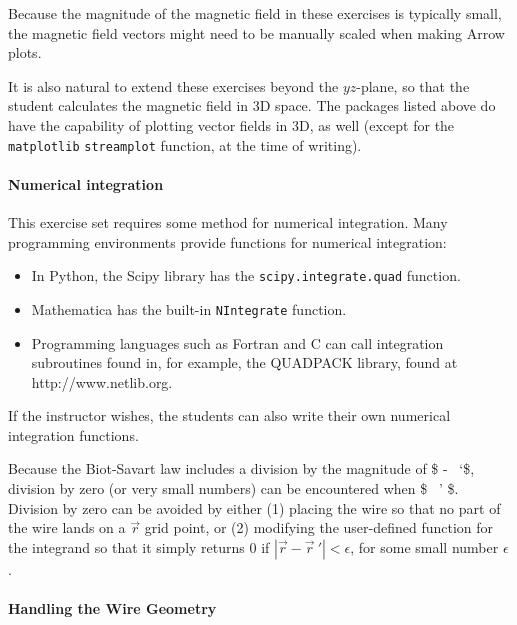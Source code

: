 \documentclass[]{article}
\providecommand{\tightlist}{%
  \setlength{\itemsep}{0pt}\setlength{\parskip}{0pt}}
\let\oldparagraph\paragraph
\renewcommand{\paragraph}[1]{\oldparagraph{#1}\mbox{}}
\begin{document}
Because the magnitude of the magnetic field in these exercises is
typically small, the magnetic field vectors might need to be manually
scaled when making Arrow plots.

It is also natural to extend these exercises beyond the \(yz\)-plane, so
that the student calculates the magnetic field in 3D space. The packages
listed above do have the capability of plotting vector fields in 3D, as
well (except for the \texttt{matplotlib} \texttt{streamplot} function,
at the time of writing).

\paragraph{Numerical integration}\label{numerical-integration}

This exercise set requires some method for numerical integration. Many
programming environments provide functions for numerical integration:

\begin{itemize}
\tightlist
\item
  In Python, the Scipy library has the \texttt{scipy.integrate.quad}
  function.
\item
  Mathematica has the built-in \texttt{NIntegrate} function.\\
\item
  Programming languages such as Fortran and C can call integration
  subroutines found in, for example, the QUADPACK library, found at
  http://www.netlib.org.
\end{itemize}

If the instructor wishes, the students can also write their own
numerical integration functions.

Because the Biot-Savart law includes a division by the magnitude of
\$ - ~`\$, division by zero (or very small numbers) can be
encountered when \$ \approx {}~' \$. Division by zero can be
avoided by either (1) placing the wire so that no part of the wire lands
on a \(\vec{r}\) grid point, or (2) modifying the user-defined function
for the integrand so that it simply returns \(0\) if
\(\left\vert \vec{r} - \vec{r}\ ' \right\vert < \epsilon\), for some
small number \(\epsilon\).

\paragraph{Handling the Wire Geometry}\label{handling-the-wire-geometry}
\end{document}

